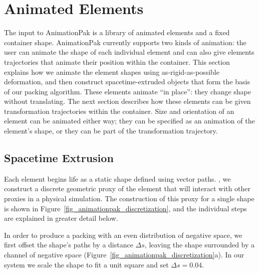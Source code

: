 \section{Animated Elements}
\label{animationpak_animated_element}



The input to AnimationPak is a library of animated elements and a
fixed container shape.  AnimationPak currently supports two kinds
of animation: the user can animate the shape of each individual
element and can also give elements trajectories that animate
their position within the container.  This
section explains how we animate the element shapes using
as-rigid-as-possible deformation, and then construct
spacetime-extruded objects that form the basis of our packing
algorithm.  These elements animate ``in place'': they change
shape without translating. The next section describes how these
elements can be given transformation trajectories within the
container. Size and orientation of an element can be animated
either way; they can be specified as an animation of the element's
shape, or they can be part of the transformation trajectory.





\subsection{Spacetime Extrusion}
\label{animationpak_spacetime_extrusion}

Each element begins life as a static shape defined using
vector paths.  , we construct a discrete
geometric proxy of the element that will interact with other
proxies in a physical simulation.  The construction of this proxy
for a single shape is shown in Figure~\ref{fig_animationpak_discretization}, and
the individual steps are explained in greater detail below.

In order to produce a packing with an even distribution of negative
space, we first offset the shape's paths by a distance $\Delta s$,
leaving the shape surrounded by a channel of negative space
(Figure~\ref{fig_animationpak_discretization}a).  In our system
we scale the shape to fit a unit square and set $\Delta s=0.04$.


